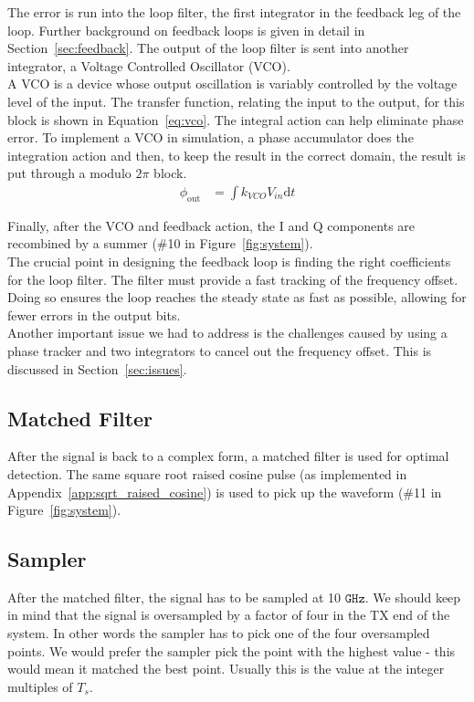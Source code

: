 \documentclass[]{article}
\begin{document}
The error is run into the loop filter, the first integrator in the feedback leg of the loop.  Further background on feedback loops is given in detail in Section~\ref{sec:feedback}. The output of the loop filter is sent into another integrator, a Voltage Controlled Oscillator (VCO). \\

A VCO is a device whose output oscillation is variably controlled by the voltage level of the input.  The transfer function, relating the input to the output, for this block is shown in Equation~\ref{eq:vco}. The integral action can help eliminate phase error. To implement a VCO in simulation, a phase accumulator does the integration action and then, to keep the result in the correct domain, the result is put through a modulo $2\pi$ block. \\

\begin{align}
\label{eq:vco}
\phi_{\text{out}} &= \int \! k_{VCO}V_{in} \mathrm{d}t
\end{align}

Finally, after the VCO and feedback action, the I and Q components are recombined by a summer (\#10 in Figure~\ref{fig:system}). \\

The crucial point in designing the feedback loop is finding the right coefficients for the loop filter.  The filter must provide a fast tracking of the frequency offset. Doing so ensures the loop reaches the steady state as fast as possible, allowing for fewer errors in the output bits. \\

Another important issue we had to address is the challenges caused by using a phase tracker and two integrators to cancel out the frequency offset. This is discussed in Section~\ref{sec:issues}.

\subsection{Matched Filter}
\label{sec:matched}
After the signal is back to a complex form, a matched filter is used for optimal detection. The same square root raised cosine pulse (as implemented in Appendix~\ref{app:sqrt_raised_cosine}) is used to pick up the waveform (\#11 in Figure~\ref{fig:system}).

\subsection{Sampler}
\label{sec:sample}
After the matched filter, the signal has to be sampled at 10 $\mathtt{GHz}$.  We should keep in mind that the signal is oversampled by a factor of four in the TX end of the system. In other words the sampler has to pick one of the four oversampled points.  We would prefer the sampler pick the point with the highest value - this would mean it matched the best point. Usually this is the value at the integer multiples of  $T_s$. \\
\end{document}
